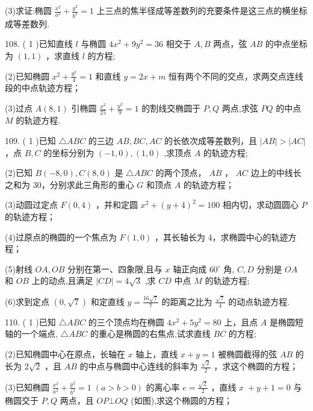 \documentclass[10pt]{article}
\begin{document}
(3)求证:椭圆 \(\frac{{x}^{2}}{{a}^{2}} + \frac{{y}^{2}}{{b}^{2}} = 1\) 上三点的焦半径成等差数列的充要条件是这三点的横坐标成等差数列.

108. ( 1 )已知直线 \(l\) 与椭圆 \(4{x}^{2} + 9{y}^{2} = {36}\) 相交于 \(A,B\) 两点，弦 \({AB}\) 的中点坐标为 \(\left( {1,1}\right)\) ，求直线 \(l\) 的方程;

(2)已知椭圆 \({x}^{2} + \frac{{y}^{2}}{4} = 1\) 和直线 \(y = {2x} + m\) 恒有两个不同的交点，求两交点连线段的中点轨迹方程；

(3)过点 \(A\left( {8,1}\right)\) 引椭圆 \(\frac{{x}^{2}}{25} + \frac{{y}^{2}}{9} = 1\) 的割线交椭圆于 \(P,Q\) 两点,求弦 \({PQ}\) 的中点 \(M\) 的轨迹方程.

109. ( 1 )已知 \(\bigtriangleup  {ABC}\) 的三边 \({AB},{BC},{AC}\) 的长依次成等差数列，且 \(\left| {AB}\right|  > \left| {AC}\right|\) ，点 \(B,C\) 的坐标分别为 \(\left( {-1,0}\right) ,\left( {1,0}\right)\) ,求顶点 \(A\) 的轨迹方程;

(2)已知 \(B\left( {-8,0}\right) ,C\left( {8,0}\right)\) 是 \(\bigtriangleup  {ABC}\) 的两个顶点， \({AB}\) ， \({AC}\) 边上的中线长之和为 30，分别求此三角形的重心 \(G\) 和顶点 \(A\) 的轨迹方程；

(3)动圆过定点 \(F\left( {0,4}\right)\) ，并和定圆 \({x}^{2} + {\left( y + 4\right) }^{2} = {100}\) 相内切，求动圆圆心 \(P\) 的轨迹方程；

(4)过原点的椭圆的一个焦点为 \(F\left( {1,0}\right)\) ，其长轴长为 4，求椭圆中心的轨迹方程；

(5)射线 \({OA},{OB}\) 分别在第一、四象限,且与 \(x\) 轴正向成 \({60}^{ \circ  }\) 角, \(C,D\) 分别是 \({OA}\) 和 \({OB}\) 上的动点,且满足 \(\left| {CD}\right|  = 4\sqrt{3}\) ,求 \({CD}\) 中点 \(M\) 的轨迹方程;

(6)求到定点 \(\left( {0,\sqrt{7}}\right)\) 和定直线 \(y = \frac{{16}\sqrt{7}}{7}\) 的距离之比为 \(\frac{\sqrt{7}}{4}\) 的动点轨迹方程.

110. ( 1 )已知 \(\bigtriangleup  {ABC}\) 的三个顶点均在椭圆 \(4{x}^{2} + 5{y}^{2} = {80}\) 上，且点 \(A\) 是椭圆短轴的一个端点, \(\bigtriangleup {ABC}\) 的重心是椭圆的右焦点,试求直线 \({BC}\) 的方程;

(2)已知椭圆中心在原点，长轴在 \(x\) 轴上，直线 \(x + y = 1\) 被椭圆截得的弦 \({AB}\) 的长为 \(2\sqrt{2}\) ，且 \({AB}\) 的中点与椭圆中心连线的斜率为 \(\frac{\sqrt{2}}{2}\) ，求这个椭圆的方程；

(3)已知椭圆 \(\frac{{x}^{2}}{{a}^{2}} + \frac{{y}^{2}}{{b}^{2}} = 1\;\left( {a > b > 0}\right)\) 的离心率 \(e = \frac{\sqrt{2}}{2}\) ，直线 \(x \; + y + 1 = 0\) 与椭圆交于 \(P,Q\) 两点，且 \({OP}\bot {OQ}\) (如图),求这个椭圆的方程；
\end{document}

